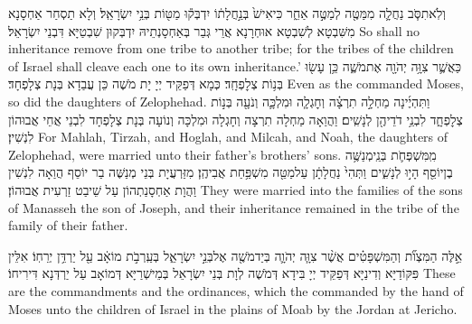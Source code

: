 {וְלֹֽא\maqqaf תִסֹּ֧ב נַחֲלָ֛ה מִמַּטֶּ֖ה לְמַטֶּ֣ה אַחֵ֑ר כִּי\maqqaf אִישׁ֙ בְּנַ֣חֲלָת֔וֹ יִדְבְּק֕וּ מַטּ֖וֹת בְּנֵ֥י יִשְׂרָאֵֽל׃}
{וְלָא תַסְחַר אַחְסָנָא מִשִּׁבְטָא לְשִׁבְטָא אוּחְרָנָא אֲרֵי גְּבַר בְּאַחְסָנְתֵיהּ יִדְבְּקוּן שִׁבְטַיָּא דִּבְנֵי יִשְׂרָאֵל׃}
{So shall no inheritance remove from one tribe to another tribe; for the tribes of the children of Israel shall cleave each one to its own inheritance.’}{}
{כַּאֲשֶׁ֛ר צִוָּ֥ה יְהֹוָ֖ה אֶת\maqqaf מֹשֶׁ֑ה כֵּ֥ן עָשׂ֖וּ בְּנ֥וֹת צְלׇפְחָֽד׃}
{כְּמָא דְּפַקֵּיד יְיָ יָת מֹשֶׁה כֵּן עֲבַדָא בְּנָת צְלָפְחָד׃}
{Even as the \lord\space commanded Moses, so did the daughters of Zelophehad.}{}
{וַתִּהְיֶ֜ינָה מַחְלָ֣ה תִרְצָ֗ה וְחׇגְלָ֧ה וּמִלְכָּ֛ה וְנֹעָ֖ה בְּנ֣וֹת צְלׇפְחָ֑ד לִבְנֵ֥י דֹדֵיהֶ֖ן לְנָשִֽׁים׃}
{וַהֲוַאָה מַחְלָה תִרְצָה וְחָגְלָה וּמִלְכָּה וְנוֹעָה בְּנָת צְלָפְחָד לִבְנֵי אֲחֵי אֲבוּהוֹן לִנְשִׁין׃}
{For Mahlah, Tirzah, and Hoglah, and Milcah, and Noah, the daughters of Zelophehad, were married unto their father’s brothers’ sons.}{}
{מִֽמִּשְׁפְּחֹ֛ת בְּנֵֽי\maqqaf מְנַשֶּׁ֥ה בֶן\maqqaf יוֹסֵ֖ף הָי֣וּ לְנָשִׁ֑ים וַתְּהִי֙ נַחֲלָתָ֔ן עַל\maqqaf מַטֵּ֖ה מִשְׁפַּ֥חַת אֲבִיהֶֽן׃}
{מִזַּרְעֲיָת בְּנֵי מְנַשֶּׁה בַר יוֹסֵף הֲוַאָה לִנְשִׁין וַהֲוָת אַחְסָנַתְהוֹן עַל שֵׁיבַט זַרְעִית אֲבוּהוֹן׃}
{They were married into the families of the sons of Manasseh the son of Joseph, and their inheritance remained in the tribe of the family of their father.}{}

{אֵ֣לֶּה הַמִּצְוֺ֞ת וְהַמִּשְׁפָּטִ֗ים אֲשֶׁ֨ר צִוָּ֧ה יְהֹוָ֛ה בְּיַד\maqqaf מֹשֶׁ֖ה אֶל\maqqaf בְּנֵ֣י יִשְׂרָאֵ֑ל בְּעַֽרְבֹ֣ת מוֹאָ֔ב עַ֖ל יַרְדֵּ֥ן יְרֵחֽוֹ׃}
{אִלֵּין פִּקּוֹדַיָּא וְדִינַיָּא דְּפַקֵּיד יְיָ בִּידָא דְּמֹשֶׁה לְוָת בְּנֵי יִשְׂרָאֵל בְּמֵישְׁרַיָּא דְּמוֹאָב עַל יַרְדְּנָא דִּירִיחוֹ׃}
{These are the commandments and the ordinances, which the \lord\space commanded by the hand of Moses unto the children of Israel in the plains of Moab by the Jordan at Jericho.}{}

\newperek
